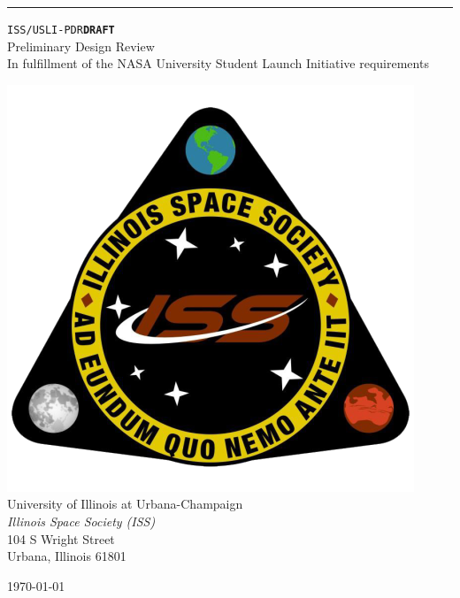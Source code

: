 \documentclass[11pt, letterpaper,oneside]{memoir}
\numberwithin{equation}{section}
\theoremstyle{definition}
\newcommand\docno{ISS/USLI-PDR}
\begin{document}
	
	
	\begin{titlingpage}		
		\raggedleft
		
		\rule{1pt}{\textheight}
		\hspace{0.01\textwidth} %
		\parbox[b]{0.97\textwidth}{ %
			
			{\Large \texttt{\docno}\hfill\texttt{\bfseries DRAFT}}\\[5\baselineskip]
			{\Huge Preliminary Design Review}
			\\
			{\Large In fulfillment of the NASA University Student Launch Initiative requirements}
			\\[3\baselineskip]
			
			\begin{center}
				\includegraphics[width=0.4\linewidth]{ISSlogo_square}\\
				{\Large University of Illinois at Urbana-Champaign}\\[2\baselineskip]
				{\Large\itshape Illinois Space Society (ISS)}\\[1\baselineskip]
				{\large 104 S Wright Street}\\
				{\large Urbana, Illinois 61801}
			\end{center}
			
			
			\vspace{0.2\textheight} %
			\vfill
			
			{\noindent \today}\\[\baselineskip] %
		}
		
	\end{titlingpage}

	
	
\end{document}

